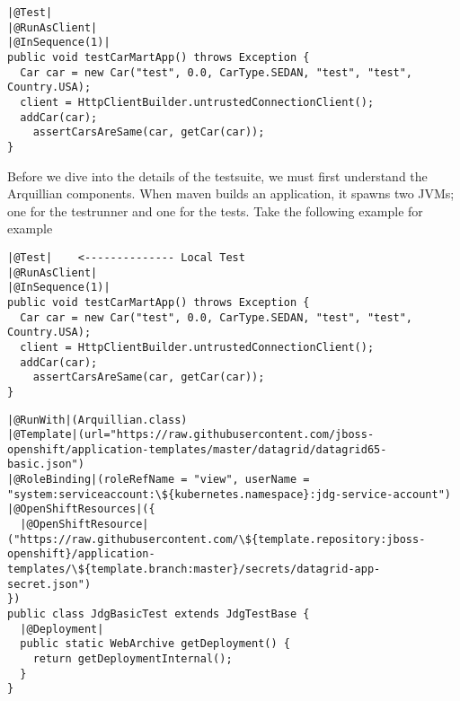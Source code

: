 \documentclass{article}
\begin{document}
\begin{lstlisting}
|@Test|   
|@RunAsClient|
|@InSequence(1)|
public void testCarMartApp() throws Exception {
  Car car = new Car("test", 0.0, CarType.SEDAN, "test", "test", Country.USA);
  client = HttpClientBuilder.untrustedConnectionClient();
  addCar(car);
	assertCarsAreSame(car, getCar(car));
}
\end{lstlisting}

\noindent Before we dive into the details of the testsuite, we must first understand the Arquillian components. When maven builds an application, it spawns two JVMs; one for the testrunner and one for the tests. Take the following example for example

\begin{lstlisting}[style=Java]
|@Test|    <-------------- Local Test
|@RunAsClient|
|@InSequence(1)|
public void testCarMartApp() throws Exception {
  Car car = new Car("test", 0.0, CarType.SEDAN, "test", "test", Country.USA);
  client = HttpClientBuilder.untrustedConnectionClient();
  addCar(car);
	assertCarsAreSame(car, getCar(car));
}
\end{lstlisting}


\begin{lstlisting}
|@RunWith|(Arquillian.class)
|@Template|(url="https://raw.githubusercontent.com/jboss-openshift/application-templates/master/datagrid/datagrid65-basic.json")
|@RoleBinding|(roleRefName = "view", userName = "system:serviceaccount:\${kubernetes.namespace}:jdg-service-account")
|@OpenShiftResources|({
  |@OpenShiftResource|("https://raw.githubusercontent.com/\${template.repository:jboss-openshift}/application-templates/\${template.branch:master}/secrets/datagrid-app-secret.json")
})
public class JdgBasicTest extends JdgTestBase {
  |@Deployment|
  public static WebArchive getDeployment() {
    return getDeploymentInternal();
  }
}
\end{lstlisting}

\fi
\end{document}
